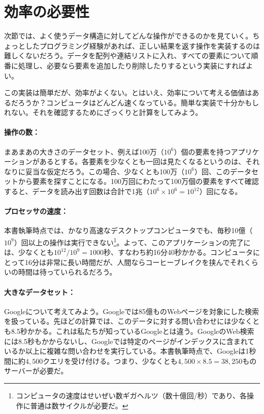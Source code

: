 \section{効率の必要性}

次節では、よく使うデータ構造に対してどんな操作ができるのかを見ていく。ちょっとしたプログラミング経験があれば、正しい結果を返す操作を実装するのは難しくないだろう。データを配列や連結リストに入れ、すべての要素について順番に処理し、必要なら要素を追加したり削除したりするという実装にすればよい。

この実装は簡単だが、効率がよくない。とはいえ、効率について考える価値はあるだろうか？コンピュータはどんどん速くなっている。簡単な実装で十分かもしれない。それを確認するためにざっくりと計算をしてみよう。

\paragraph{操作の数：}
まあまあの大きさのデータセット、例えば100万（$10^6$）個の要素を持つアプリケーションがあるとする。各要素を少なくとも一回は見たくなるというのは、それなりに妥当な仮定だろう。この場合、少なくとも100万（$10^6$）回、このデータセットから要素を探すことになる。100万回にわたって100万個の要素をすべて確認すると、データを読み出す回数は合計で1兆（$10^6\times 10^6=10^{12}$）回になる。

\paragraph{プロセッサの速度：}
本書執筆時点では、かなり高速なデスクトップコンピュータでも、毎秒10億（$10^9$）回以上の操作は実行できない\footnote{コンピュータの速度はせいぜい数ギガヘルツ（数十億回/秒）であり、各操作に普通は数サイクルが必要だ。}。よって、このアプリケーションの完了には、少なくとも$10^{12}/10^9=1000$秒、すなわち約16分40秒かかる。コンピュータにとって16分は非常に長い時間だが、人間ならコーヒーブレイクを挟んでそれくらいの時間は待っていられるだろう。

\paragraph{大きなデータセット：}
Googleについて考えてみよう。Googleでは85億ものWebページを対象にした検索を扱っている。先ほどの計算では、このデータに対する問い合わせには少なくとも8.5秒かかる。これは私たちが知っているGoogleとは違う。GoogleのWeb検索には8.5秒もかからないし、Googleでは特定のページがインデックスに含まれているか以上に複雑な問い合わせを実行している。本書執筆時点で、Googleは1秒間に約$4,500$クエリを受け付ける。つまり、少なくとも$4,500 \times 8.5 = 38,250$ものサーバーが必要だ。

